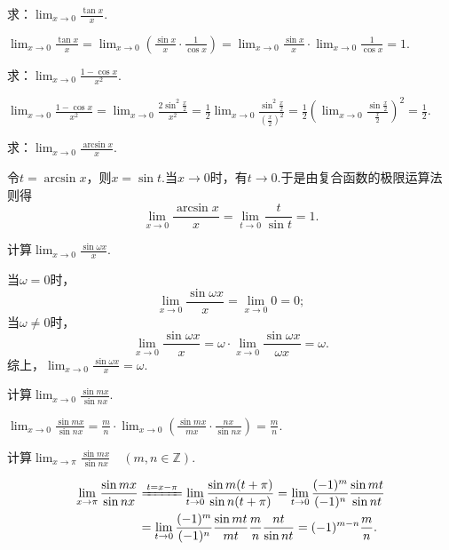 \begin{example}
\def\l{\lim_{x\to0}}
求：\(\l \frac{\tan x}{x}\).
\begin{solution}
\(
\l \frac{\tan x}{x}
= \l \left(\frac{\sin x}{x} \cdot \frac{1}{\cos x}\right)
= \l \frac{\sin x}{x} \cdot \lim_{x\to0}\frac{1}{\cos x}
= 1.
\)
\end{solution}
\end{example}

\begin{example}
\def\l{\lim_{x\to0}}
求：\(\l \frac{1 - \cos x}{x^2}\).
\begin{solution}
\(
\l \frac{1 - \cos x}{x^2}
= \l \frac{2 \sin^2\frac{x}{2}}{x^2}
= \frac{1}{2} \l \frac{\sin^2\frac{x}{2}}{\left(\frac{x}{2}\right)^2}
= \frac{1}{2} \left(\l \frac{\sin \frac{x}{2}}{\frac{x}{2}}\right)^2
= \frac{1}{2}.
\)
\end{solution}
\end{example}

\begin{example}
求：\(\lim_{x\to0}\frac{\arcsin x}{x}\).
\begin{solution}
令\(t = \arcsin x\)，则\(x = \sin t\).当\(x\to0\)时，有\(t\to0\).于是由复合函数的极限运算法则得\[
\lim_{x\to0}\frac{\arcsin x}{x}
= \lim_{t\to0}\frac{t}{\sin t}
= 1.
\]
\end{solution}
\end{example}

\begin{example}
\def\l{\lim_{x\to0}}
计算\(\l \frac{\sin \omega x}{x}\).
\begin{solution}
当\(\omega=0\)时，\[
\l \frac{\sin \omega x}{x} = \l 0 = 0;
\]当\(\omega\neq0\)时，\[
\l \frac{\sin \omega x}{x}
= \omega \cdot \l \frac{\sin \omega x}{\omega x}
= \omega.
\]综上，\(\l \frac{\sin \omega x}{x} = \omega\).
\end{solution}
\end{example}

\begin{example}
\def\l{\lim_{x\to0}}
计算\(\l \frac{\sin mx}{\sin nx}\).
\begin{solution}
\(
\l \frac{\sin mx}{\sin nx}
= \frac{m}{n} \cdot \l \left( \frac{\sin mx}{mx} \cdot \frac{nx}{\sin nx} \right)
= \frac{m}{n}
\).
\end{solution}
\end{example}

\begin{example}
\def\l#1{\lim_{#1}}
计算\(\l{x\to\pi} \frac{\sin mx}{\sin nx} \quad(m,n\in\mathbb{Z})\).
\begin{solution}
\begin{align*}
\l{x\to\pi} \frac{\sin mx}{\sin nx}
&\xlongequal{t=x-\pi}
\l{t\to0} \frac{\sin m(t+\pi)}{\sin n(t+\pi)}
= \l{t\to0} \frac{(-1)^m}{(-1)^n} \frac{\sin mt}{\sin nt} \\
&= \l{t\to0} \frac{(-1)^m}{(-1)^n} \frac{\sin mt}{mt} \frac{m}{n} \frac{nt}{\sin nt}
= (-1)^{m-n} \frac{m}{n}.
\end{align*}
\end{solution}
\end{example}

